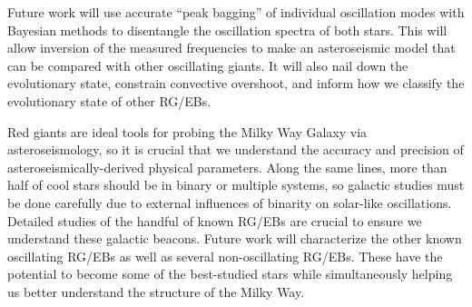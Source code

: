 Future work will use accurate ``peak bagging'' of individual oscillation modes with Bayesian methods to disentangle the oscillation spectra of both stars. This will allow inversion of the measured frequencies to make an asteroseismic model that can be compared with other oscillating giants. It will also nail down the evolutionary state, constrain convective overshoot, and inform how we classify the evolutionary state of other RG/EBs.

Red giants are ideal tools for probing the Milky Way Galaxy via asteroseismology, so it is crucial that we understand the accuracy and precision of asteroseismically-derived physical parameters. Along the same lines, more than half of cool stars should be in binary or multiple systems, so galactic studies must be done carefully due to external influences of binarity on solar-like oscillations. Detailed studies of the handful of known RG/EBs are crucial to ensure we understand these galactic beacons. Future work will characterize the other known oscillating RG/EBs as well as several non-oscillating RG/EBs. These have the potential to become some of the best-studied stars while simultaneously helping us better understand the structure of the Milky Way.
